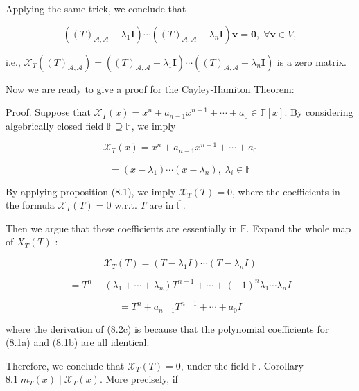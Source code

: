 \documentclass[11pt]{article}
\begin{document}
Applying the same trick, we conclude that

\[
\left( {{\left( T\right) }_{\mathcal{A},\mathcal{A}} - {\lambda }_1\mathbf{I}}\right) \cdots \left( {{\left( T\right) }_{\mathcal{A},\mathcal{A}} - {\lambda }_n\mathbf{I}}\right) \mathbf{v} = \mathbf{0},\;\forall \mathbf{v} \in  V,
\]

i.e., \({\mathcal{X}}_{T}\left( {\left( T\right) }_{\mathcal{A},\mathcal{A}}\right)  = \left( {{\left( T\right) }_{\mathcal{A},\mathcal{A}} - {\lambda }_1\mathbf{I}}\right) \cdots \left( {{\left( T\right) }_{\mathcal{A},\mathcal{A}} - {\lambda }_n\mathbf{I}}\right)\) is a zero matrix.

Now we are ready to give a proof for the Cayley-Hamiton Theorem:

Proof. Suppose that \({\mathcal{X}}_{T}\left( x\right)  = {x}^n + {a}_{n - 1}{x}^{n - 1} + \cdots  + {a}_{0} \in  \mathbb{F}\left\lbrack  x\right\rbrack\). By considering algebrically closed field \(\overline{\mathbb{F}} \supseteq  \mathbb{F}\), we imply

\[
{\mathcal{X}}_{T}\left( x\right)  = {x}^n + {a}_{n - 1}{x}^{n - 1} + \cdots  + {a}_{0} \tag{8.1a}
\]

\[
= \left( {x - {\lambda }_1}\right) \cdots \left( {x - {\lambda }_n}\right) ,\;{\lambda }_{i} \in  \overline{\mathbb{F}} \tag{8.1b}
\]

By applying proposition (8.1), we imply \({\mathcal{X}}_{T}\left( T\right)  = 0\), where the coefficients in the formula \({\mathcal{X}}_{T}\left( T\right)  = 0\) w.r.t. \(T\) are in \(\overline{\mathbb{F}}\).

Then we argue that these coefficients are essentially in \(\mathbb{F}\). Expand the whole map of \({X}_{T}\left( T\right)\) :

\[
{\mathcal{X}}_{T}\left( T\right)  = \left( {T - {\lambda }_1I}\right) \cdots \left( {T - {\lambda }_nI}\right)  \tag{8.2a}
\]

\[
= {T}^n - \left( {{\lambda }_1 + \cdots  + {\lambda }_n}\right) {T}^{n - 1} + \cdots  + {\left( -1\right) }^n{\lambda }_1\cdots {\lambda }_nI \tag{8.2b}
\]

\[
= {T}^n + {a}_{n - 1}{T}^{n - 1} + \cdots  + {a}_{0}I \tag{8.2c}
\]

where the derivation of (8.2c) is because that the polynomial coefficients for (8.1a) and (8.1b) are all identical.

Therefore, we conclude that \({\mathcal{X}}_{T}\left( T\right)  = 0\), under the field \(\mathbb{F}\). Corollary \({8.1}\;{m}_{T}\left( x\right)  \mid  {\mathcal{X}}_{T}\left( x\right)\). More precisely, if
\end{document}
